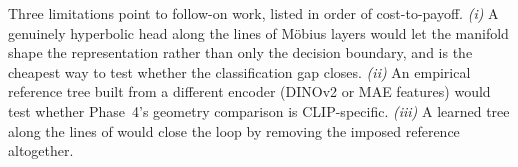 Three limitations point to follow-on work, listed in
order of cost-to-payoff. \textit{(i)} A genuinely hyperbolic head
along the lines of M\"obius layers \citep{ganea2018hyperbolic} would
let the manifold shape the representation rather than only the
decision boundary, and is the cheapest way to test whether the
classification gap closes. \textit{(ii)} An empirical reference tree
built from a different encoder (DINOv2 or MAE features) would test
whether Phase~4's geometry comparison is CLIP-specific. \textit{(iii)}
A learned tree along the lines of \citet{chami2020trees} would close
the loop by removing the imposed reference altogether.
